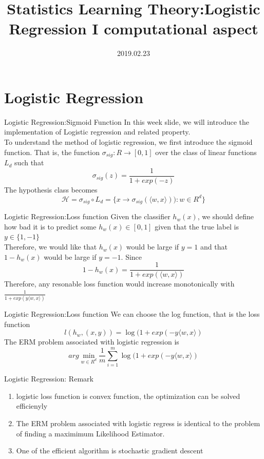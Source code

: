 \documentclass{beamer}
\title[Introduction]{Statistics Learning Theory:Logistic Regression I computational aspect}
\author{}
\institute{}
\date{2019.02.23}
\begin{document}
\begin{frame}
  \titlepage
\end{frame}


\section{Logistic Regression}
\begin{frame}{Logistic Regression:Sigmoid Function}
	In this week slide, we will introduce the implementation of Logistic regression and related property. \\
	To understand the method of logistic regression, we first introduce the sigmoid function. That is, the function $\sigma_{sig}:R \rightarrow [0,1]$ over the class of linear functions $L_d$ such that
	\[\sigma_{sig}(z) = \frac{1}{1+exp(-z)}\]
	The hypothesis class becomes
\[\mathcal{H} = \sigma_{sig} \circ L_d = \{x \rightarrow \sigma_{sig}(\langle w,x \rangle)): w \in R^d\}\]
\end{frame}
\begin{frame}{Logistic Regression:Loss function}
	Given the classifier $h_{w}(x)$, we should define how bad it is to predict some $h_w(x) \in [0,1]$ given that the true label is $y \in \{1,-1\}$ \\
	Therefore, we would like that $h_w(x)$ would be large if $y=1$ and that $1-h_w(x)$ would be large if $y=-1$. Since
	\[1 - h_w(x) = \frac{1}{1+exp(\langle w,x \rangle)}\]
	Therefore, any resonable loss function would increase monotonically with $\frac{1}{1+exp( y \langle w,x \rangle)}$
\end{frame}
\begin{frame}{Logistic Regression:Loss function}
	We can choose the log function, that is the loss function
	\[l(h_w,(x,y)) = \log (1+exp( -y \langle w,x \rangle)\]
	The ERM problem associated with logistic regression is 
	\[arg\min_{w \in R^d} \frac{1}{m} \sum^m_{i=1} \log(1+exp( -y \langle w,x \rangle)\]
\end{frame}
\begin{frame}{Logistic Regression: Remark}
	\begin{enumerate}
		\item logistic loss function is convex function, the optimization can be solved efficienyly
		\item The ERM problem associated with logistic regress is identical to the problem of finding a maximimum Likelihood Estimator.
		\item One of the efficient algorithm is stochastic gradient descent
	\end{enumerate}
\end{frame}
\end{document}

